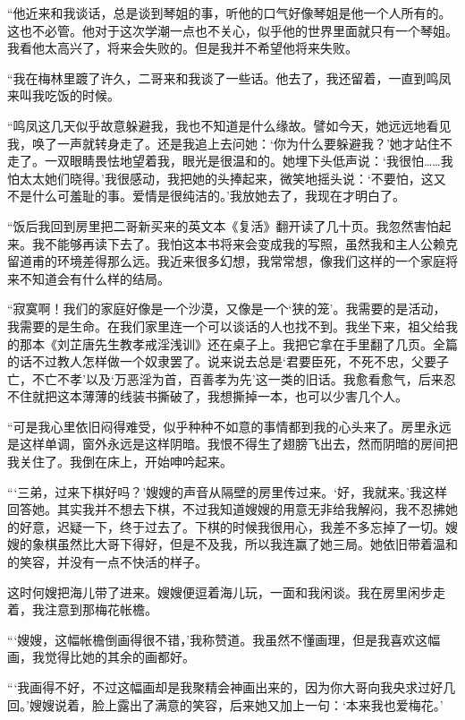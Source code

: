 {    \par “他近来和我谈话，总是谈到琴姐的事，听他的口气好像琴姐是他一个人所有的。这也不必管。他对于这次学潮一点也不关心，似乎他的世界里面就只有一个琴姐。我看他太高兴了，将来会失败的。但是我并不希望他将来失败。
    \par “我在梅林里踱了许久，二哥来和我谈了一些话。他去了，我还留着，一直到鸣凤来叫我吃饭的时候。
    \par “鸣凤这几天似乎故意躲避我，我也不知道是什么缘故。譬如今天，她远远地看见我，唤了一声就转身走了。还是我追上去问她：‘你为什么要躲避我？’她才站住不走了。一双眼睛畏怯地望着我，眼光是很温和的。她埋下头低声说：‘我很怕……我怕太太她们晓得。’我很感动，我把她的头捧起来，微笑地摇头说：‘不要怕，这又不是什么可羞耻的事。爱情是很纯洁的。’我放她去了，我现在才明白了。
    \par “饭后我回到房里把二哥新买来的英文本《复活》翻开读了几十页。我忽然害怕起来。我不能够再读下去了。我怕这本书将来会变成我的写照，虽然我和主人公赖克留道甫的环境差得那么远。我近来很多幻想，我常常想，像我们这样的一个家庭将来不知道会有什么样的结局。
    \par “寂寞啊！我们的家庭好像是一个沙漠，又像是一个‘狭的笼’。我需要的是活动，我需要的是生命。在我们家里连一个可以谈话的人也找不到。我坐下来，祖父给我的那本《刘芷唐先生教孝戒淫浅训》还在桌子上。我把它拿在手里翻了几页。全篇的话不过教人怎样做一个奴隶罢了。说来说去总是‘君要臣死，不死不忠，父要子亡，不亡不孝’以及‘万恶淫为首，百善孝为先’这一类的旧话。我愈看愈气，后来忍不住就把这本薄薄的线装书撕破了，我想撕掉一本，也可以少害几个人。
    \par “可是我心里依旧闷得难受，似乎种种不如意的事情都到我的心头来了。房里永远是这样单调，窗外永远是这样阴暗。我恨不得生了翅膀飞出去，然而阴暗的房间把我关住了。我倒在床上，开始呻吟起来。
    \par “‘三弟，过来下棋好吗？’嫂嫂的声音从隔壁的房里传过来。‘好，我就来。’我这样回答她。其实我并不想去下棋，不过我知道嫂嫂的用意无非给我解闷，我不忍拂她的好意，迟疑一下，终于过去了。下棋的时候我很用心，我差不多忘掉了一切。嫂嫂的象棋虽然比大哥下得好，但是不及我，所以我连赢了她三局。她依旧带着温和的笑容，并没有一点不快活的样子。
    \par 这时何嫂把海儿带了进来。嫂嫂便逗着海儿玩，一面和我闲谈。我在房里闲步走着，我注意到那梅花帐檐。
    \par “‘嫂嫂，这幅帐檐倒画得很不错，’我称赞道。我虽然不懂画理，但是我喜欢这幅画，我觉得比她的其余的画都好。
    \par “‘我画得不好，不过这幅画却是我聚精会神画出来的，因为你大哥向我央求过好几回。’嫂嫂说着，脸上露出了满意的笑容，后来她又加上一句：‘本来我也爱梅花。’
}
